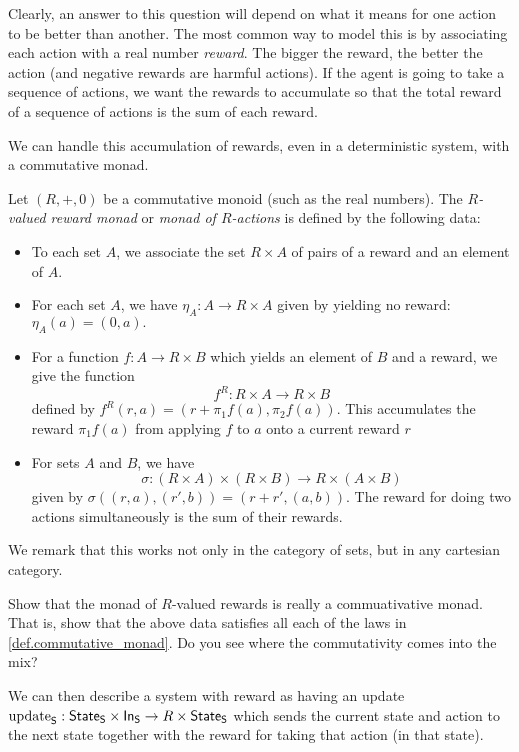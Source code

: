 \documentclass[DynamicalBook]{subfiles}
\begin{document}
Clearly, an answer to this question will depend on what it means for one action
to be better than another. The most common way to model this is by associating
each action with a real number \emph{reward}. The bigger the reward, the better
the action (and negative rewards are harmful actions). If the agent is going to
take a sequence of actions, we want the rewards to accumulate so that the total
reward of a sequence of actions is the sum of each reward.

We can handle this accumulation of rewards, even in a deterministic system, with
a commutative monad.

\begin{definition}
Let $(R, +, 0)$ be a commutative monoid (such as the real numbers). The
\emph{$R$-valued reward monad} or \emph{monad of $R$-actions} is defined by the
following data:
\begin{itemize}
  \item To each set $A$, we associate the set $R \times A$ of pairs of a reward
    and an element of $A$.
  \item For each set $A$, we have $\eta_A : A \to R \times A$ given by yielding
    no reward:
    $\eta_A(a) = (0, a).$
  \item For a function $f : A \to R \times B$ which yields an element of $B$ and
    a reward, we give the function
    \[
      f^R : R \times A \to R \times B
    \]
 defined by $f^R(r, a) = (r + \pi_1f(a), \pi_2f(a))$. This accumulates the
 reward $\pi_1f(a)$ from applying $f$ to $a$ onto a current reward $r$
\item For sets $A$ and $B$, we have
  \[
\sigma : (R \times A) \times (R \times B) \to R \times (A \times B)
\]
given by $\sigma((r, a), (r', b)) = (r + r', (a, b))$. The reward for doing two
actions simultaneously is the sum of their rewards.
  \end{itemize}
  
We remark that this works not only in the category of sets, but in any cartesian category.
\end{definition}

\begin{exercise}
  Show that the monad of $R$-valued rewards is really a commuativative monad.
  That is, show that the above data satisfies all each of the laws in
  \cref{def.commutative_monad}. Do you see where the commutativity comes into
  the mix?
\end{exercise}

We can then describe a system with reward as having an update $\mathrm{update}_{\mathsf{S}} :
\mathsf{State}_{\mathsf{S}} \times \mathsf{In}_{\mathsf{S}} \to R \times \mathsf{State}_{\mathsf{S}}$ which sends the current state
and action to the next state together with the reward for taking that action (in
that state).
\end{document}

